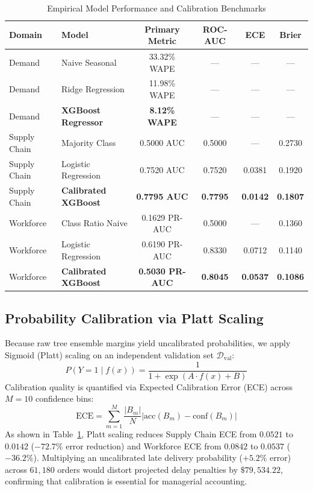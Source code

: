 \documentclass[conference]{IEEEtran}
\begin{document}
\begin{table}[htbp]
\caption{Empirical Model Performance and Calibration Benchmarks}
\begin{center}
\begin{tabular}{llcccc}
\toprule
\textbf{Domain} & \textbf{Model} & \textbf{Primary Metric} & \textbf{ROC-AUC} & \textbf{ECE} & \textbf{Brier} \\
\midrule
Demand & Naive Seasonal & 33.32\% WAPE & --- & --- & --- \\
Demand & Ridge Regression & 11.98\% WAPE & --- & --- & --- \\
Demand & \textbf{XGBoost Regressor} & \textbf{8.12\% WAPE} & --- & --- & --- \\
\midrule
Supply Chain & Majority Class & 0.5000 AUC & 0.5000 & --- & 0.2730 \\
Supply Chain & Logistic Regression & 0.7520 AUC & 0.7520 & 0.0381 & 0.1920 \\
Supply Chain & \textbf{Calibrated XGBoost} & \textbf{0.7795 AUC} & \textbf{0.7795} & \textbf{0.0142} & \textbf{0.1807} \\
\midrule
Workforce & Class Ratio Naive & 0.1629 PR-AUC & 0.5000 & --- & 0.1360 \\
Workforce & Logistic Regression & 0.6190 PR-AUC & 0.8330 & 0.0712 & 0.1140 \\
Workforce & \textbf{Calibrated XGBoost} & \textbf{0.5030 PR-AUC} & \textbf{0.8045} & \textbf{0.0537} & \textbf{0.1086} \\
\bottomrule
\end{tabular}
\label{tab:model_performance}
\end{center}
\end{table}

\subsection{Probability Calibration via Platt Scaling}\label{sec:calib}
Because raw tree ensemble margins yield uncalibrated probabilities, we apply Sigmoid (Platt) scaling \cite{platt1999probabilistic} on an independent validation set $\mathcal{D}_{\text{val}}$:
\begin{equation}
P(Y = 1 \mid f(x)) = \frac{1}{1 + \exp(A \cdot f(x) + B)}
\end{equation}
Calibration quality is quantified via Expected Calibration Error (ECE) across $M=10$ confidence bins:
\begin{equation}
\text{ECE} = \sum_{m=1}^M \frac{|B_m|}{N} \left| \text{acc}(B_m) - \text{conf}(B_m) \right|
\end{equation}
As shown in Table~\ref{tab:model_performance}, Platt scaling reduces Supply Chain ECE from $0.0521$ to $\mathbf{0.0142}$ ($-72.7\%$ error reduction) and Workforce ECE from $0.0842$ to $\mathbf{0.0537}$ ($-36.2\%$). Multiplying an uncalibrated late delivery probability ($+5.2\%$ error) across $61,180$ orders would distort projected delay penalties by $\$79,534.22$, confirming that calibration is essential for managerial accounting.
\end{document}
